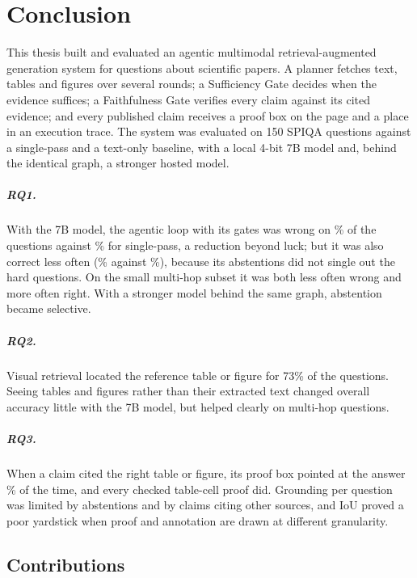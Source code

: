\chapter{Conclusion}
\label{sec:conclusion}

This thesis built and evaluated an agentic multimodal retrieval-augmented generation
system for questions about scientific papers. A planner fetches text, tables and
figures over several rounds; a Sufficiency Gate decides when the evidence suffices; a
Faithfulness Gate verifies every claim against its cited evidence; and every published
claim receives a proof box on the page and a place in an execution trace. The system
was evaluated on 150 SPIQA questions against a single-pass and a text-only baseline,
with a local 4-bit 7B model and, behind the identical graph, a stronger hosted model.

\paragraph{RQ1.} With the 7B model, the agentic loop with its gates was wrong on
\nFullWrong\% of the questions against \nSPWrong\% for single-pass, a reduction beyond
luck; but it was also correct less often (\nFullCorrect\% against \nSPCorrect\%), because
its abstentions did not single out the hard questions. On the small multi-hop subset it
was both less often wrong and more often right. With a stronger model behind the same
graph, abstention became selective.

\paragraph{RQ2.} Visual retrieval located the reference table or figure for 73\% of the
questions. Seeing tables and figures rather than their extracted text changed overall
accuracy little with the 7B model, but helped clearly on multi-hop questions.

\paragraph{RQ3.} When a claim cited the right table or figure, its proof box pointed at
the answer \nProofInsideFull\% of the time, and every checked table-cell proof did. Grounding
per question was limited by abstentions and by claims citing other sources, and IoU
proved a poor yardstick when proof and annotation are drawn at different granularity.

\section{Contributions}

